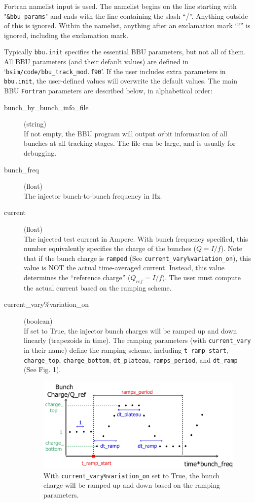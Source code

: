 \documentclass{hitec}
\newcommand{\Newline}{\hfil \\}
\begin{document}
Fortran namelist input is used. The namelist begins on the line starting with "\texttt{\&bbu_params}"
and ends with the line containing the slash ``/''. Anything outside of this is ignored. Within the
namelist, anything after an exclamation mark ``!'' is ignored, including the exclamation mark.
 
Typically \texttt{bbu.init} specifies the essential BBU parameters, but not all of them. All BBU parameters (and their default values) are defined in `\texttt{bsim/code/bbu_track_mod.f90}'. If the user includes extra parameters in \texttt{bbu.init}, the user-defined values will overwrite the default values.
The main BBU \texttt{Fortran} parameters are described below, in alphabetical order:

\begin{description}
\item[bunch_by_bunch_info_file] (string)  \Newline
If not empty, the BBU program will output orbit information of all bunches at all tracking stages. The file can be large, and is usually for debugging.
\item[bunch_freq] (float) \Newline
The injector bunch-to-bunch frequency in Hz.
%
\item[current] (float) \Newline
The injected test current in Ampere. With bunch frequency specified, this number equivalently specifies the charge of the bunches ($Q = I/f$). Note that if the bunch charge is \texttt{ramped} (See \texttt{current_vary\%variation_on}), this value is NOT the actual time-averaged current. Instead, this value determines the ``reference charge'' ($Q_{ref} = I/f$). The user must compute the actual current based on the ramping scheme. 
%
\item[current_vary\%variation_on] (boolean) \Newline
If set to True, the injector bunch charges will be ramped up and down linearly (trapezoids in time). The ramping parameters (with \texttt{current_vary} in their name) define the ramping scheme, including \texttt{t_ramp_start}, \texttt{charge_top}, \texttt{charge_bottom}, \texttt{dt_plateau}, \texttt{ramps_period}, and \texttt{dt_ramp} (See Fig. 1). 

\begin{figure}[h]
\includegraphics[scale=0.4]{BBU_code_description_ramping}
\caption{ With \texttt{current_vary\%variation_on} set to True, the bunch charge will be ramped up and down based on the ramping parameters.}
\label{setup1}
\end{figure}


\end{description}
\end{document}
